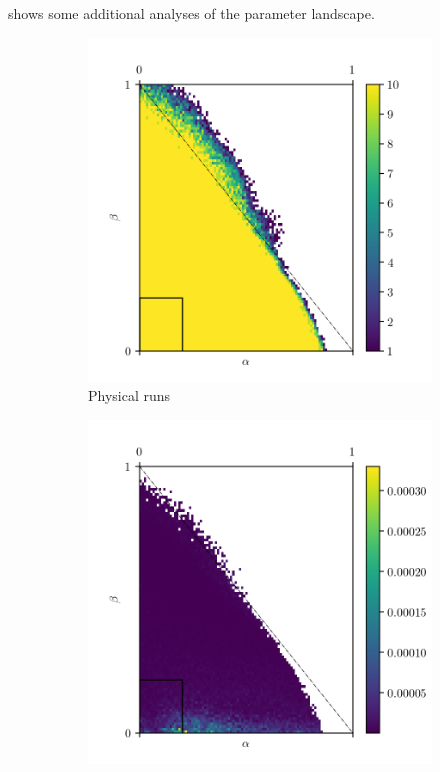  shows some additional analyses of the parameter landscape.
\begin{figure}[ht!]
  \centering
  \begin{subfigure}{0.3\textwidth}
    \centering
    \includegraphics[width=\textwidth]{figure/physical_runs}
    \caption{Physical runs}
    \label{fig:physical_runs}
  \end{subfigure}%
  \begin{subfigure}{0.3\textwidth}
    \centering
    \includegraphics[width=\textwidth]{figure/chimera_var}

\end{subfigure}
\end{figure}

